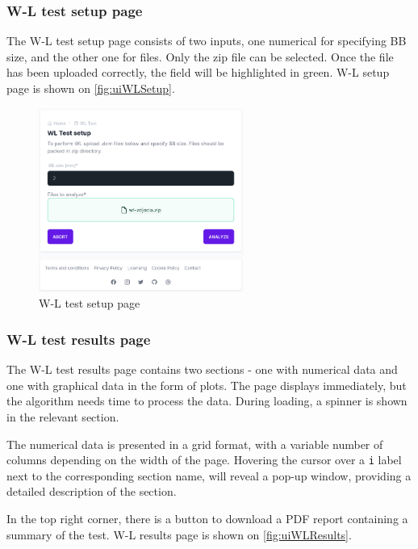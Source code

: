 \subsubsection{W-L test setup page}

The W-L test setup page consists of two inputs, one numerical for specifying BB size, and the other one for files. Only the zip file can be selected. Once the file has been uploaded correctly, the field will be highlighted in green. W-L setup page is shown on \autoref{fig:uiWLSetup}.

\begin{figure}
    \centering
    \includegraphics[width=0.6\textwidth]{Content/Images/ui_wl_setup_page.png}
    \caption{W-L test setup page}
    \label{fig:uiWLSetup}
\end{figure}

\subsubsection{W-L test results page}

The W-L test results page contains two sections - one with numerical data and one with graphical data in the form of plots. The page displays immediately, but the algorithm needs time to process the data. During loading, a spinner is shown in the relevant section. 

The numerical data is presented in a grid format, with a variable number of columns depending on the width of the page. Hovering the cursor over a \verb|i| label next to the corresponding section name, will reveal a pop-up window, providing a detailed description of the section.

In the top right corner, there is a button to download a PDF report containing a summary of the test. W-L results page is shown on \autoref{fig:uiWLResults}.

